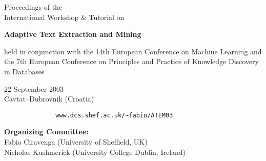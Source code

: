 \documentclass[12pt,a4paper]{article}
\begin{document}
\pagestyle{empty}

\begin{center}

\begin{large}

\mbox{}
\vspace{4cm}

\begin{LARGE}
Proceedings of the \\
International Workshop \& Tutorial on \\

\bigskip

\textbf{Adaptive Text Extraction and Mining}

\bigskip

held in conjunction with the 
14th European Conference on Machine Learning 
and the
7th European Conference on Principles and Practice of Knowledge Discovery in Databases
\end{LARGE}

\bigskip
\mbox{}
\bigskip

22 September 2003 \\
Cavtat--Dubrovnik (Croatia) 

\bigskip

\begin{verbatim}
              www.dcs.shef.ac.uk/~fabio/ATEM03
\end{verbatim}

\bigskip
\mbox{}
\bigskip

\textbf{Organizing Committee:} \\
Fabio Ciravenga (University of Sheffield, UK) \\
Nicholas Kushmerick (University College Dublin, Ireland)

\end{large}
\end{center}

\newpage
\end{document}
